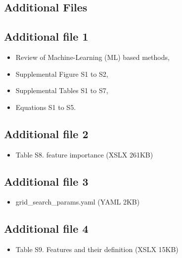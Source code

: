 \documentclass{bmcart}
\begin{document}
\begin{backmatter}
\clearpage

\section*{Additional Files}
\subsection*{Additional file 1} \label{add:figs_tbls}
    
\begin{itemize}
\item Review of Machine-Learning (ML) based methods, \\
\item     Supplemental Figure S1 to S2, \\
\item     Supplemental Tables S1 to S7,\\
\item     Equations S1 to S5.
\end{itemize}
   
\subsection*{Additional file 2}  \label{add:feature importance}
  
\begin{itemize}
\item Table S8. feature importance (XSLX 261KB)
\end{itemize}

\subsection*{Additional file 3}  \label{add:hyperoptparams}
\begin{itemize}
\item    grid\_search\_params.yaml (YAML 2KB)
\end{itemize}

\subsection*{Additional file 4}  \label{add:feature_definition}
\begin{itemize}
\item   Table S9. Features and their definition (XSLX 15KB)
\end{itemize}


\end{backmatter}
\end{document}
